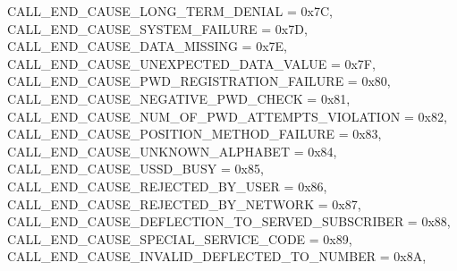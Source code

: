 \begin{DoxyItemize}
 C\+A\+L\+L\+\_\+\+E\+N\+D\+\_\+\+C\+A\+U\+S\+E\+\_\+\+L\+O\+N\+G\+\_\+\+T\+E\+R\+M\+\_\+\+D\+E\+N\+I\+AL = 0x7C,~\newline
 C\+A\+L\+L\+\_\+\+E\+N\+D\+\_\+\+C\+A\+U\+S\+E\+\_\+\+S\+Y\+S\+T\+E\+M\+\_\+\+F\+A\+I\+L\+U\+RE = 0x7D,~\newline
 C\+A\+L\+L\+\_\+\+E\+N\+D\+\_\+\+C\+A\+U\+S\+E\+\_\+\+D\+A\+T\+A\+\_\+\+M\+I\+S\+S\+I\+NG = 0x7E,~\newline
 C\+A\+L\+L\+\_\+\+E\+N\+D\+\_\+\+C\+A\+U\+S\+E\+\_\+\+U\+N\+E\+X\+P\+E\+C\+T\+E\+D\+\_\+\+D\+A\+T\+A\+\_\+\+V\+A\+L\+UE = 0x7F,~\newline
 C\+A\+L\+L\+\_\+\+E\+N\+D\+\_\+\+C\+A\+U\+S\+E\+\_\+\+P\+W\+D\+\_\+\+R\+E\+G\+I\+S\+T\+R\+A\+T\+I\+O\+N\+\_\+\+F\+A\+I\+L\+U\+RE = 0x80,~\newline
 C\+A\+L\+L\+\_\+\+E\+N\+D\+\_\+\+C\+A\+U\+S\+E\+\_\+\+N\+E\+G\+A\+T\+I\+V\+E\+\_\+\+P\+W\+D\+\_\+\+C\+H\+E\+CK = 0x81,~\newline
 C\+A\+L\+L\+\_\+\+E\+N\+D\+\_\+\+C\+A\+U\+S\+E\+\_\+\+N\+U\+M\+\_\+\+O\+F\+\_\+\+P\+W\+D\+\_\+\+A\+T\+T\+E\+M\+P\+T\+S\+\_\+\+V\+I\+O\+L\+A\+T\+I\+ON = 0x82,~\newline
 C\+A\+L\+L\+\_\+\+E\+N\+D\+\_\+\+C\+A\+U\+S\+E\+\_\+\+P\+O\+S\+I\+T\+I\+O\+N\+\_\+\+M\+E\+T\+H\+O\+D\+\_\+\+F\+A\+I\+L\+U\+RE = 0x83,~\newline
 C\+A\+L\+L\+\_\+\+E\+N\+D\+\_\+\+C\+A\+U\+S\+E\+\_\+\+U\+N\+K\+N\+O\+W\+N\+\_\+\+A\+L\+P\+H\+A\+B\+ET = 0x84,~\newline
 C\+A\+L\+L\+\_\+\+E\+N\+D\+\_\+\+C\+A\+U\+S\+E\+\_\+\+U\+S\+S\+D\+\_\+\+B\+U\+SY = 0x85,~\newline
 C\+A\+L\+L\+\_\+\+E\+N\+D\+\_\+\+C\+A\+U\+S\+E\+\_\+\+R\+E\+J\+E\+C\+T\+E\+D\+\_\+\+B\+Y\+\_\+\+U\+S\+ER = 0x86,~\newline
 C\+A\+L\+L\+\_\+\+E\+N\+D\+\_\+\+C\+A\+U\+S\+E\+\_\+\+R\+E\+J\+E\+C\+T\+E\+D\+\_\+\+B\+Y\+\_\+\+N\+E\+T\+W\+O\+RK = 0x87,~\newline
 C\+A\+L\+L\+\_\+\+E\+N\+D\+\_\+\+C\+A\+U\+S\+E\+\_\+\+D\+E\+F\+L\+E\+C\+T\+I\+O\+N\+\_\+\+T\+O\+\_\+\+S\+E\+R\+V\+E\+D\+\_\+\+S\+U\+B\+S\+C\+R\+I\+B\+ER = 0x88,~\newline
 C\+A\+L\+L\+\_\+\+E\+N\+D\+\_\+\+C\+A\+U\+S\+E\+\_\+\+S\+P\+E\+C\+I\+A\+L\+\_\+\+S\+E\+R\+V\+I\+C\+E\+\_\+\+C\+O\+DE = 0x89,~\newline
 C\+A\+L\+L\+\_\+\+E\+N\+D\+\_\+\+C\+A\+U\+S\+E\+\_\+\+I\+N\+V\+A\+L\+I\+D\+\_\+\+D\+E\+F\+L\+E\+C\+T\+E\+D\+\_\+\+T\+O\+\_\+\+N\+U\+M\+B\+ER = 0x8A,~\newline

\end{DoxyItemize}
